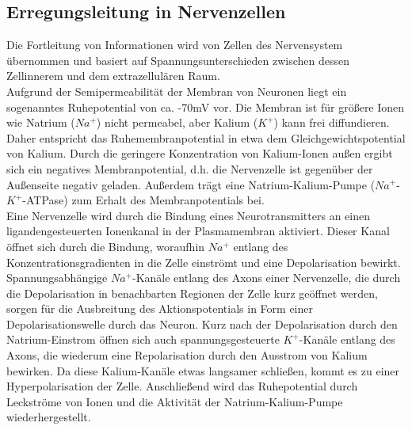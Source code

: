 \documentclass[11pt]{article}
\begin{document}
\subsection{Erregungsleitung in Nervenzellen}
Die Fortleitung von Informationen wird von Zellen des Nervensystem übernommen und basiert auf Spannungsunterschieden zwischen dessen Zellinnerem und dem extrazellulären Raum. \\
Aufgrund der Semipermeabilität der Membran von Neuronen liegt ein sogenanntes Ruhepotential von ca. -70mV vor. Die Membran ist für größere Ionen wie Natrium ($Na^{+}$) nicht permeabel, aber Kalium ($K^{+}$) kann frei diffundieren. Daher entspricht das Ruhemembranpotential in etwa dem Gleichgewichtspotential von Kalium. Durch die geringere Konzentration von Kalium-Ionen außen ergibt sich ein negatives Membranpotential, d.h. die Nervenzelle ist gegenüber der Außenseite negativ geladen. Außerdem trägt eine Natrium-Kalium-Pumpe ($Na^{+}$-$K^+$-ATPase) zum Erhalt des Membranpotentials bei.  \\
Eine Nervenzelle wird durch die Bindung eines Neurotransmitters an einen ligandengesteuerten Ionenkanal in der Plasmamembran aktiviert. Dieser Kanal öffnet sich durch die Bindung, woraufhin $Na^{+}$ entlang des Konzentrationsgradienten in die Zelle einströmt und eine Depolarisation bewirkt. Spannungsabhängige $Na^{+}$-Kanäle entlang des Axons einer Nervenzelle, die durch die Depolarisation in benachbarten Regionen der Zelle kurz geöffnet werden, sorgen für die Ausbreitung des Aktionspotentials in Form einer Depolarisationswelle durch das Neuron. Kurz nach der Depolarisation durch den Natrium-Einstrom öffnen sich auch spannungsgesteuerte $K^+$-Kanäle entlang des Axons, die wiederum eine Repolarisation durch den Ausstrom von Kalium bewirken. Da diese Kalium-Kanäle etwas langsamer schließen, kommt es zu einer Hyperpolarisation der Zelle. Anschließend wird das Ruhepotential durch Leckströme von Ionen und die Aktivität der Natrium-Kalium-Pumpe wiederhergestellt.  \cite{lehninger}
\end{document}
